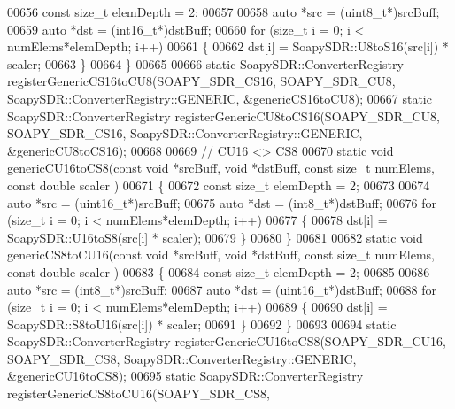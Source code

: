 \begin{DoxyCode}
00656   \textcolor{keyword}{const} \textcolor{keywordtype}{size\_t} elemDepth = 2;
00657 
00658   \textcolor{keyword}{auto} *src = (uint8\_t*)srcBuff;
00659   \textcolor{keyword}{auto} *dst = (int16\_t*)dstBuff;
00660   \textcolor{keywordflow}{for} (\textcolor{keywordtype}{size\_t} i = 0; i < numElems*elemDepth; i++)
00661     \{
00662       dst[i] = SoapySDR::U8toS16(src[i]) * scaler;
00663     \}
00664 \}
00665 
00666 \textcolor{keyword}{static} SoapySDR::ConverterRegistry registerGenericCS16toCU8(SOAPY_SDR_CS16, 
      SOAPY_SDR_CU8, SoapySDR::ConverterRegistry::GENERIC, &genericCS16toCU8);
00667 \textcolor{keyword}{static} SoapySDR::ConverterRegistry registerGenericCU8toCS16(SOAPY_SDR_CU8, 
      SOAPY_SDR_CS16, SoapySDR::ConverterRegistry::GENERIC, &genericCU8toCS16);
00668 
00669 \textcolor{comment}{// CU16 <> CS8}
00670 \textcolor{keyword}{static} \textcolor{keywordtype}{void} genericCU16toCS8(\textcolor{keyword}{const} \textcolor{keywordtype}{void} *srcBuff, \textcolor{keywordtype}{void} *dstBuff, \textcolor{keyword}{const} \textcolor{keywordtype}{size\_t} numElems, \textcolor{keyword}{const} \textcolor{keywordtype}{double} scaler
      )
00671 \{
00672   \textcolor{keyword}{const} \textcolor{keywordtype}{size\_t} elemDepth = 2;
00673 
00674   \textcolor{keyword}{auto} *src = (uint16\_t*)srcBuff;
00675   \textcolor{keyword}{auto} *dst = (int8\_t*)dstBuff;
00676   \textcolor{keywordflow}{for} (\textcolor{keywordtype}{size\_t} i = 0; i < numElems*elemDepth; i++)
00677     \{
00678       dst[i] = SoapySDR::U16toS8(src[i] * scaler);
00679     \}
00680 \}
00681 
00682 \textcolor{keyword}{static} \textcolor{keywordtype}{void} genericCS8toCU16(\textcolor{keyword}{const} \textcolor{keywordtype}{void} *srcBuff, \textcolor{keywordtype}{void} *dstBuff, \textcolor{keyword}{const} \textcolor{keywordtype}{size\_t} numElems, \textcolor{keyword}{const} \textcolor{keywordtype}{double} scaler
      )
00683 \{
00684   \textcolor{keyword}{const} \textcolor{keywordtype}{size\_t} elemDepth = 2;
00685 
00686   \textcolor{keyword}{auto} *src = (int8\_t*)srcBuff;
00687   \textcolor{keyword}{auto} *dst = (uint16\_t*)dstBuff;
00688   \textcolor{keywordflow}{for} (\textcolor{keywordtype}{size\_t} i = 0; i < numElems*elemDepth; i++)
00689     \{
00690       dst[i] = SoapySDR::S8toU16(src[i]) * scaler;
00691     \}
00692 \}
00693 
00694 \textcolor{keyword}{static} SoapySDR::ConverterRegistry registerGenericCU16toCS8(SOAPY_SDR_CU16, 
      SOAPY_SDR_CS8, SoapySDR::ConverterRegistry::GENERIC, &genericCU16toCS8);
00695 \textcolor{keyword}{static} SoapySDR::ConverterRegistry registerGenericCS8toCU16(SOAPY_SDR_CS8, 

\end{DoxyCode}
